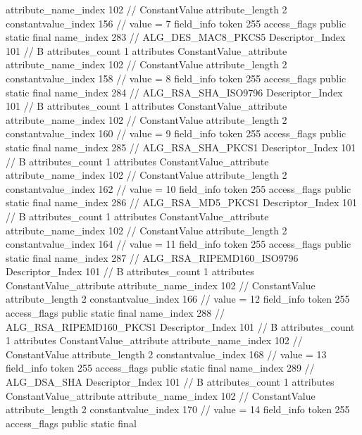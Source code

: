 {{{{{{{					attribute_name_index	102		// ConstantValue
					attribute_length	2
					constantvalue_index	156		// value = 7
				}
				}
			}
			field_info {
				token	255
				access_flags	public static final
				name_index	283		// ALG_DES_MAC8_PKCS5
				Descriptor_Index	101		// B
				attributes_count	1
				attributes {
				ConstantValue_attribute {
					attribute_name_index	102		// ConstantValue
					attribute_length	2
					constantvalue_index	158		// value = 8
				}
				}
			}
			field_info {
				token	255
				access_flags	public static final
				name_index	284		// ALG_RSA_SHA_ISO9796
				Descriptor_Index	101		// B
				attributes_count	1
				attributes {
				ConstantValue_attribute {
					attribute_name_index	102		// ConstantValue
					attribute_length	2
					constantvalue_index	160		// value = 9
				}
				}
			}
			field_info {
				token	255
				access_flags	public static final
				name_index	285		// ALG_RSA_SHA_PKCS1
				Descriptor_Index	101		// B
				attributes_count	1
				attributes {
				ConstantValue_attribute {
					attribute_name_index	102		// ConstantValue
					attribute_length	2
					constantvalue_index	162		// value = 10
				}
				}
			}
			field_info {
				token	255
				access_flags	public static final
				name_index	286		// ALG_RSA_MD5_PKCS1
				Descriptor_Index	101		// B
				attributes_count	1
				attributes {
				ConstantValue_attribute {
					attribute_name_index	102		// ConstantValue
					attribute_length	2
					constantvalue_index	164		// value = 11
				}
				}
			}
			field_info {
				token	255
				access_flags	public static final
				name_index	287		// ALG_RSA_RIPEMD160_ISO9796
				Descriptor_Index	101		// B
				attributes_count	1
				attributes {
				ConstantValue_attribute {
					attribute_name_index	102		// ConstantValue
					attribute_length	2
					constantvalue_index	166		// value = 12
				}
				}
			}
			field_info {
				token	255
				access_flags	public static final
				name_index	288		// ALG_RSA_RIPEMD160_PKCS1
				Descriptor_Index	101		// B
				attributes_count	1
				attributes {
				ConstantValue_attribute {
					attribute_name_index	102		// ConstantValue
					attribute_length	2
					constantvalue_index	168		// value = 13
				}
				}
			}
			field_info {
				token	255
				access_flags	public static final
				name_index	289		// ALG_DSA_SHA
				Descriptor_Index	101		// B
				attributes_count	1
				attributes {
				ConstantValue_attribute {
					attribute_name_index	102		// ConstantValue
					attribute_length	2
					constantvalue_index	170		// value = 14
				}
				}
			}
			field_info {
				token	255
				access_flags	public static final
}}}}}
